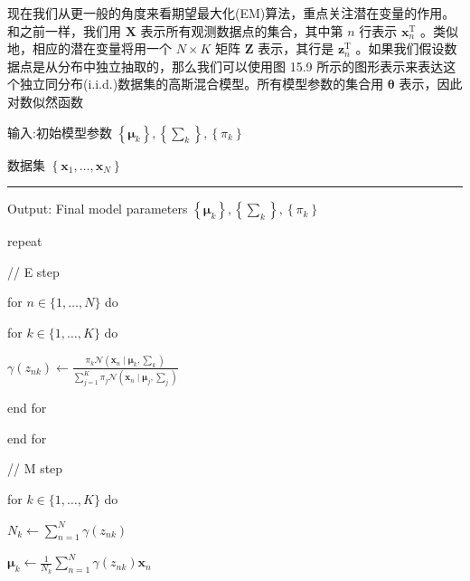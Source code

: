 \documentclass[10pt]{article}
\newcommand{\HRule}{\begin{center}\rule{0.9\linewidth}{0.2mm}\end{center}}
\begin{document}
现在我们从更一般的角度来看期望最大化(EM)算法，重点关注潜在变量的作用。和之前一样，我们用 \(\mathbf{X}\) 表示所有观测数据点的集合，其中第 \(n\) 行表示 \({\mathbf{x}}_{n}^{\mathrm{T}}\) 。类似地，相应的潜在变量将用一个 \(N \times  K\) 矩阵 \(\mathbf{Z}\) 表示，其行是 \({\mathbf{z}}_{n}^{\mathrm{T}}\) 。如果我们假设数据点是从分布中独立抽取的，那么我们可以使用图 15.9 所示的图形表示来表达这个独立同分布(i.i.d.)数据集的高斯混合模型。所有模型参数的集合用 \(\mathbf{\theta }\) 表示，因此对数似然函数

输入:初始模型参数 \(\left\{  {\mathbf{\mu }}_{k}\right\}  ,\left\{  {\mathbf{\sum }}_{k}\right\}  ,\left\{  {\pi }_{k}\right\}\)

数据集 \(\left\{  {{\mathbf{x}}_{1},\ldots ,{\mathbf{x}}_{N}}\right\}\)

\HRule

Output: Final model parameters \(\left\{  {\mathbf{\mu }}_{k}\right\}  ,\left\{  {\mathbf{\sum }}_{k}\right\}  ,\left\{  {\pi }_{k}\right\}\)

repeat

\hspace*{2em} // E step

\hspace*{1em} for \(n \in  \{ 1,\ldots ,N\}\) do

\hspace*{3em} for \(k \in  \{ 1,\ldots ,K\}\) do

\hspace*{4em} \(\gamma \left( {z}_{nk}\right)  \leftarrow  \frac{{\pi }_{k}\mathcal{N}\left( {{\mathbf{x}}_{n} \mid  {\mathbf{\mu }}_{k},{\mathbf{\sum }}_{k}}\right) }{\mathop{\sum }\limits_{{j = 1}}^{K}{\pi }_{j}\mathcal{N}\left( {{\mathbf{x}}_{n} \mid  {\mathbf{\mu }}_{j},{\mathbf{\sum }}_{j}}\right) }\)

\hspace*{3em} end for

\hspace*{1em} end for

\hspace*{1em} // M step

\hspace*{1em} for \(k \in  \{ 1,\ldots ,K\}\) do

\hspace*{3em} \({N}_{k} \leftarrow  \mathop{\sum }\limits_{{n = 1}}^{N}\gamma \left( {z}_{nk}\right)\)

\hspace*{3em} \({\mathbf{\mu }}_{k} \leftarrow  \frac{1}{{N}_{k}}\mathop{\sum }\limits_{{n = 1}}^{N}\gamma \left( {z}_{nk}\right) {\mathbf{x}}_{n}\)
\end{document}
